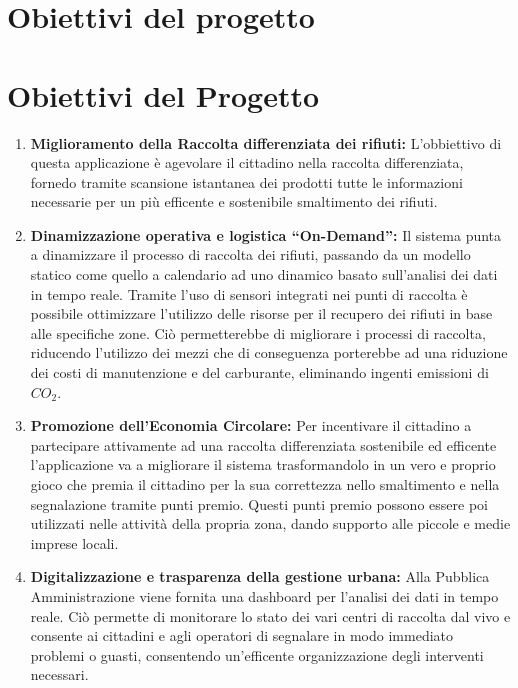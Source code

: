 \documentclass[12pt,a4paper]{article}
\begin{document}
\newpage
{} %
\tableofcontents
\newpage

\setcounter{page}{1}   %

\section{Obiettivi del progetto}
\section*{Obiettivi del Progetto}

\begin{enumerate}[label=\textbf{(O\arabic*)}]
    \item \textbf{Miglioramento della Raccolta differenziata dei rifiuti:}
    L'obbiettivo di questa applicazione è agevolare il cittadino nella raccolta differenziata, fornedo tramite scansione istantanea dei prodotti tutte le informazioni necessarie per un più     efficente e sostenibile smaltimento dei rifiuti.

    \item \textbf{Dinamizzazione operativa e logistica ``On-Demand'':} 
    Il sistema punta a dinamizzare il processo di raccolta dei rifiuti, passando da un modello statico come quello a calendario ad uno dinamico basato sull'analisi dei dati in tempo reale.
    Tramite l'uso di sensori integrati nei punti di raccolta è possibile ottimizzare l'utilizzo delle risorse per il recupero dei rifiuti in base alle specifiche zone.
    Ciò permetterebbe di migliorare i processi di raccolta, riducendo l'utilizzo dei mezzi che di conseguenza porterebbe ad una riduzione dei costi di manutenzione e del carburante, eliminando ingenti emissioni di $CO_2$.

    \item \textbf{Promozione dell'Economia Circolare:} 
    Per incentivare il cittadino a partecipare attivamente ad una raccolta differenziata sostenibile ed efficente l'applicazione va a migliorare il sistema trasformandolo in un vero e proprio gioco che premia il cittadino per la sua correttezza nello smaltimento e nella segnalazione tramite punti premio.
    Questi punti premio possono essere poi utilizzati nelle attività della propria zona, dando supporto alle piccole e medie imprese locali.

    \item \textbf{Digitalizzazione e trasparenza della gestione urbana:} 
    Alla Pubblica Amministrazione viene fornita una dashboard per l'analisi dei dati in tempo reale. Ciò permette di monitorare lo stato dei vari centri di raccolta dal vivo e consente ai cittadini e agli operatori di segnalare in modo immediato problemi o guasti, consentendo un'efficente organizzazione degli interventi necessari.


\end{enumerate}
\end{document}
